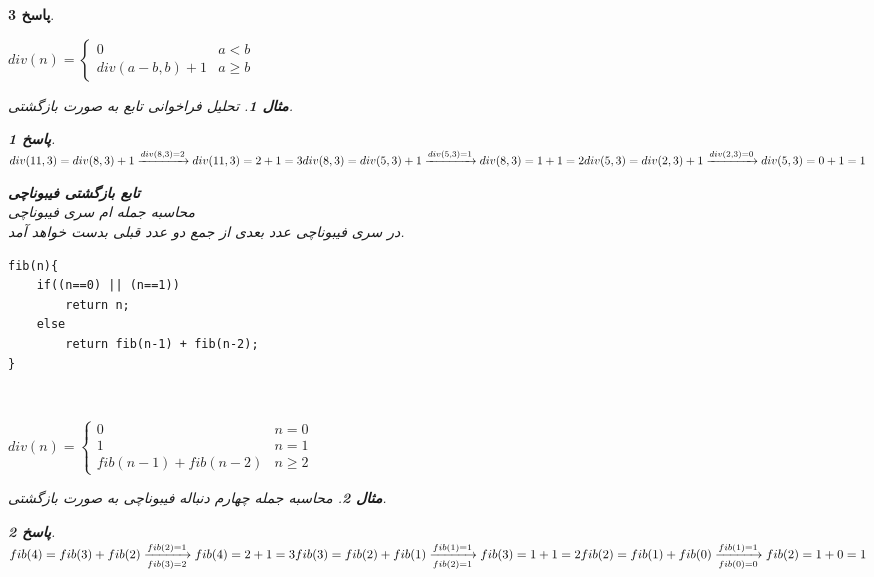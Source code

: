 \documentclass[12pt]{article}
\newtheorem{question}{مثال}[section]
\newtheorem{answer}{پاسخ}[section]
\begin{document}
\begin{answer}
\begin{LTR}
\begin{math}
div(n) =
\begin{cases}
	0 & a<b\\
	div(a-b,b)+1 & a \ge b
\end{cases}
\end{math}
\end{LTR}
\newpage
\begin{question}
	تحلیل فراخوانی تابع  به صورت بازگشتی.\\
\end{question}
\begin{answer}
\begin{math}
div(11,3) = div(8,3) + 1 \xrightarrow{div(8,3)=2} div(11,3) = 2 + 1 = 3\\
div(8,3)  = div(5,3) + 1 \xrightarrow{div(5,3)=1} div(8,3) = 1 + 1 = 2\\
div(5,3)  = div(2,3) + 1 \xrightarrow{div(2,3)=0} div(5,3) = 0 + 1 = 1\\  
\end{math}
\end{answer}

\textbf{تابع بازگشتی فیبوناچی}\\
محاسبه جمله ام سری فیبوناچی \\
در سری فیبوناچی عدد بعدی از جمع دو عدد قبلی بدست خواهد آمد.\\
\begin{latin}
\begin{lstlisting}
fib(n){
	if((n==0) || (n==1))
		return n;
	else
		return fib(n-1) + fib(n-2);
}
\end{lstlisting}
\end{latin}\\

\begin{LTR}
\begin{math}
div(n) =
\begin{cases}
	0 & n = 0\\
	1 & n = 1\\
	fib(n-1) + fib(n-2) & n \ge 2
\end{cases}
\end{math}
\end{LTR}
\begin{question}
	محاسبه جمله چهارم دنباله فیبوناچی به صورت بازگشتی.\\
\end{question}
\begin{answer}
\begin{math}
fib(4) = fib(3) + fib(2) \xrightarrow[fib(3)=2]{fib(2)=1} fib(4) = 2 + 1 = 3\\  
\newline
fib(3) = fib(2)+ fib(1) \xrightarrow[fib(2)=1]{fib(1)=1}
fib(3) = 1 + 1 = 2\\  
\newline
fib(2) = fib(1) + fib(0) \xrightarrow[fib(0)=0]{fib(1)=1} fib(2) = 1 + 0 = 1\\  
\end{math}
\end{answer}
\newpage


\end{answer}
\end{document}
